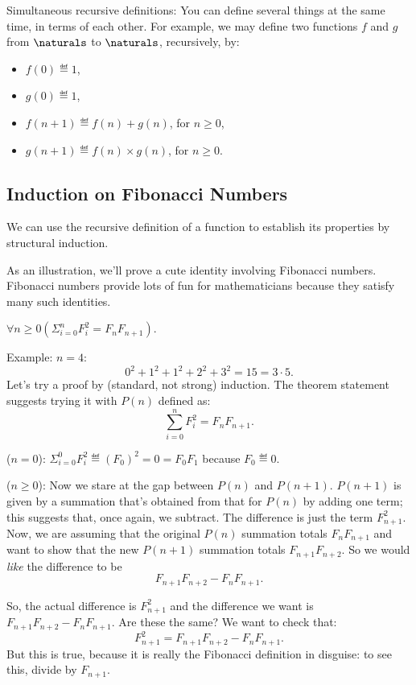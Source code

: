 \begin{description}
\begin{editingnotes}

\item[Simultaneous recursive definitions:]
  You can define several things at the same time, in terms of each
  other.  For example, we may define two functions $f$ and $g$ from
  $\naturals$ to $\naturals$, recursively, by:
  \begin{itemize}
  \item
    $f(0) \eqdef 1$,
  \item
    $g(0) \eqdef 1$,
  \item
    $f(n+1) \eqdef f(n) + g(n)$, for $n \geq 0$,
  \item
    $g(n+1) \eqdef f(n) \times g(n)$, for $n \geq 0$.
  \end{itemize}

\end{editingnotes}

\end{description}

\begin{editingnotes}

\subsection{Induction on Fibonacci Numbers}

We can use the recursive definition of a function to establish its
properties by structural induction.

As an illustration, we'll prove a cute identity involving Fibonacci
numbers.  Fibonacci numbers provide lots of fun for mathematicians because
they satisfy many such identities.
\begin{proposition}
  $\forall n \geq 0 (\Sigma_{i=0}^n F_i^2 = F_n F_{n+1})$.
\end{proposition}

Example: $n = 4$:
\[
0^2 + 1^2 + 1^2 + 2^2 + 3^2 = 15 = 3 \cdot 5.
\]
Let's try a proof by (standard, not strong) induction.  The theorem
statement suggests trying it with $P(n)$ defined as:
\[
\sum_{i=0}^n F_i^2 = F_n F_{n+1}.
\]

 ($n=0$):
$\Sigma_{i=0}^0 F_i^2 \eqdef (F_0)^2 = 0 = F_0 F_1$ because
$F_0 \eqdef 0$.

 ($n\geq 0$):  Now we stare at the gap between
$P(n)$ and $P(n+1)$.  $P(n+1)$ is given by a summation that's obtained
from that for $P(n)$ by adding one term; this suggests that, once again,
we subtract.  The difference is just the term $F_{n+1}^2$.  Now, we are
assuming that the original $P(n)$ summation totals $F_n F_{n+1}$ and want
to show that the new $P(n+1)$ summation totals $F_{n+1} F_{n+2}$.  So we
would {\em like\/} the difference to be
\[
F_{n+1} F_{n+2} - F_n F_{n+1}.
\]

So, the actual difference is $F_{n+1}^2$ and the difference we want is
$F_{n+1} F_{n+2} - F_n F_{n+1}$.  Are these the same?  We want to check
that:
\[
F_{n+1}^2 = F_{n+1} F_{n+2} - F_n F_{n+1}.
\]
But this is true, because it is really the Fibonacci definition in
disguise: to see this, divide by $F_{n+1}$.

\end{editingnotes}


